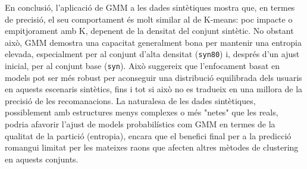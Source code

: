 \documentclass[a4paper,12pt]{report}
\begin{document}
En conclusió, l'aplicació de GMM a les dades sintètiques mostra que, en termes de precisió, el seu comportament és molt similar al de K-means: poc impacte o empitjorament amb K, depenent de la densitat del conjunt sintètic. No obstant això, GMM demostra una capacitat generalment bona per mantenir una entropia elevada, especialment per al conjunt d'alta densitat (\texttt{syn80}) i, després d'un ajust inicial, per al conjunt base (\texttt{syn}). Això suggereix que l'enfocament basat en models pot ser més robust per aconseguir una distribució equilibrada dels usuaris en aquests escenaris sintètics, fins i tot si això no es tradueix en una millora de la precisió de les recomanacions. La naturalesa de les dades sintètiques, possiblement amb estructures menys complexes o més "netes" que les reals, podria afavorir l'ajust de models probabilístics com GMM en termes de la qualitat de la partició (entropia), encara que el benefici final per a la predicció romangui limitat per les mateixes raons que afecten altres mètodes de clustering en aquests conjunts.
\end{document}
